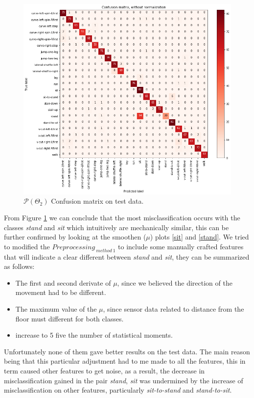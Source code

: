 \begin{figure}[htpb!]
	\centering
	\includegraphics[width=\textwidth]{images/conf_ma.png}
	\caption{$\mathcal{P}(\Theta_{2})$  Confusion matrix on test data.}
	\label{fig:confusion}
\end{figure}


From Figure \ref{fig:confusion} we can conclude that the most misclassification occurs with the classes \emph{stand} and \emph{sit} which intuitively are mechanically similar, this can be further confirmed by looking at the smoothen ($\mu$) plots \ref{sit} and \ref{stand}. We tried to modified the $Preprocessing_{ \ method \ 1}$ to include some manually crafted features that will indicate a clear different between \emph{stand} and \emph{sit}, they can be summarized as follows:


\begin{itemize}
	\item The first and second derivate of $\mu$, since we believed the direction of the movement had to be different.
	\item The maximum value of the $\mu$, since sensor data related to distance from the floor must different for both classes.
	\item increase to 5 five the number of statistical moments. 
\end{itemize}

Unfortunately none of them gave better results on the test data. The main reason being that this particular adjustment had to me made to all the features, this in term caused other features to get noise, as a result, the decrease in misclassification gained in the pair  \emph{stand}, \emph{sit} was undermined by the increase of misclassification on other features, particularly \emph{sit-to-stand} and \emph{stand-to-sit}.

